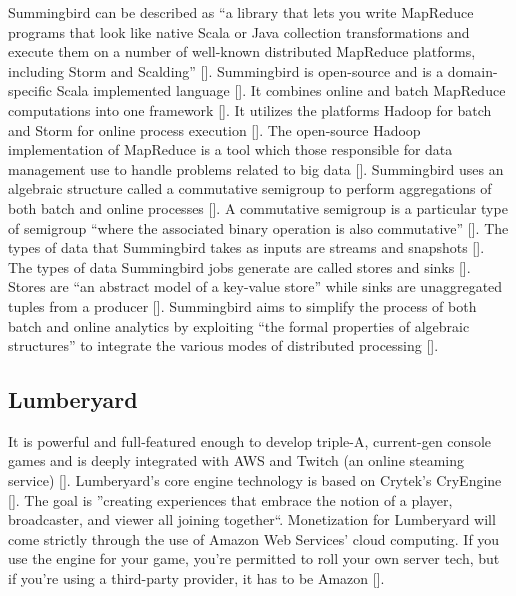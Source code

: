Summingbird can be described as ``a library that lets you write
MapReduce programs that look like native Scala or Java collection
transformations and execute them on a number of well-known distributed
MapReduce platforms, including Storm and
Scalding'' [\cite{summingbirdgit}]. Summingbird is open-source and is a
domain-specific Scala implemented
language [\cite{boykin2014summingbird}]. It combines online and batch
MapReduce computations into one
framework [\cite{boykin2014summingbird}]. It utilizes the platforms
Hadoop for batch and Storm for online process
execution [\cite{boykin2014summingbird}]. The open-source Hadoop
implementation of MapReduce is a tool which those responsible for data
management use to handle problems related to big
data [\cite{boykin2014summingbird}]. Summingbird uses an algebraic
structure called a commutative semigroup to perform aggregations of
both batch and online processes [\cite{boykin2014summingbird}]. A
commutative semigroup is a particular type of semigroup ``where the
associated binary operation is also
commutative'' [\cite{boykin2014summingbird}].  The types of data that
Summingbird takes as inputs are streams and
snapshots [\cite{boykin2014summingbird}]. The types of data Summingbird
jobs generate are called stores and
sinks [\cite{boykin2014summingbird}]. Stores are ``an abstract model of
a key-value store'' while sinks are unaggregated tuples from a
producer [\cite{boykin2014summingbird}]. Summingbird aims to simplify
the process of both batch and online analytics by exploiting ``the
formal properties of algebraic structures'' to integrate the various
modes of distributed processing [\cite{boykin2014summingbird}].


     
\subsection{Lumberyard}
     
It is powerful and full-featured enough to develop triple-A,
current-gen console games and is deeply integrated with AWS and Twitch
(an online steaming service) [\cite{gamasutra}]. Lumberyard's core
engine technology is based on Crytek's CryEngine [\cite{hands}]. The
goal is ''creating experiences that embrace the notion of a player,
broadcaster, and viewer all joining
together``\cite{gamasutra}. Monetization for Lumberyard will come
strictly through the use of Amazon Web Services' cloud computing. If
you use the engine for your game, you're permitted to roll your own
server tech, but if you're using a third-party provider, it has to be
Amazon [\cite{what}].

